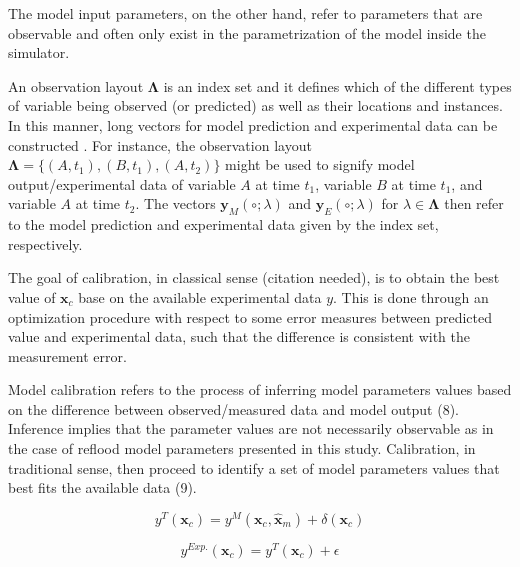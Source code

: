 The model input parameters, on the other hand, refer to parameters that are observable and often only exist in the parametrization of the model inside the simulator.

An observation layout $\boldsymbol{\Lambda}$ is an index set and it defines which of the different types of variable being observed (or predicted) as well as their locations and instances.
In this manner, long vectors for model prediction and experimental data can be constructed \cite{Reichert2012}.
For instance, the observation layout $\boldsymbol{\Lambda} = \{(A,t_1), (B,t_1), (A, t_2)\}$ might be used to signify model output/experimental data of variable $A$ at time $t_1$, variable $B$ at time $t_1$, and variable $A$ at time $t_2$.
The vectors $\bm{y}_M(\circ;\lambda)$ and $\bm{y}_E(\circ;\lambda)$ for $\lambda \in \boldsymbol{\Lambda}$ then refer to the model prediction and experimental data given by the index set, respectively.

The goal of calibration, in classical sense (citation needed), is to obtain the best value of $\bm{x}_c$ base on the available experimental data $y$.
This is done through an optimization procedure with respect to some error measures between predicted value and experimental data, such that the difference is consistent with the measurement error.


Model calibration refers to the process of inferring model parameters values based on the difference between observed/measured data and model output (8).
Inference implies that the parameter values are not necessarily observable as in the case of reflood model parameters presented in this study.
Calibration, in traditional sense, then proceed to identify a set of model parameters values that best fits the available data (9).






\begin{equation}
    y^T(\bm{x}_c) = y^M (\bm{x}_c, \bm{\hat{x}}_m) + \delta(\bm{x}_c)
\label{eq:bc_koh_true_model}
\end{equation}

\begin{equation}
    y^{Exp.}(\bm{x}_c) = y^T (\bm{x}_c) + \epsilon
\label{eq:bc_koh_true_measured}
\end{equation}



